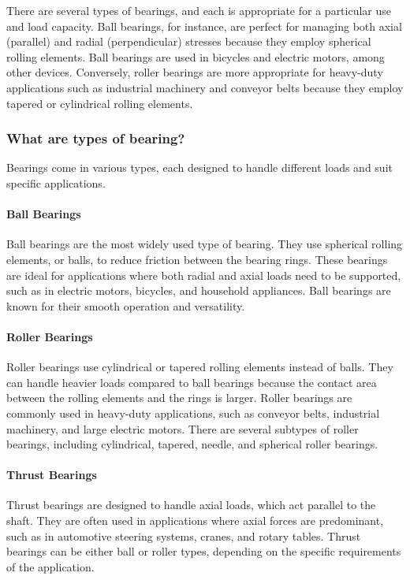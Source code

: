 \documentclass[../../main]{subfiles}
\begin{document}
There are several types of bearings, and each is appropriate for a particular use and load capacity. Ball bearings, for instance, are perfect for managing both axial (parallel) and radial (perpendicular) stresses because they employ spherical rolling elements. Ball bearings are used in bicycles and electric motors, among other devices. Conversely, roller bearings are more appropriate for heavy-duty applications such as industrial machinery and conveyor belts because they employ tapered or cylindrical rolling elements.

\subsubsection{What are types of bearing?}
Bearings come in various types, each designed to handle different loads and suit specific applications.

\paragraph{Ball Bearings}
Ball bearings are the most widely used type of bearing. They use spherical rolling elements, or balls, to reduce friction between the bearing rings. These bearings are ideal for applications where both radial and axial loads need to be supported, such as in electric motors, bicycles, and household appliances. Ball bearings are known for their smooth operation and versatility.

\paragraph{Roller Bearings}
Roller bearings use cylindrical or tapered rolling elements instead of balls. They can handle heavier loads compared to ball bearings because the contact area between the rolling elements and the rings is larger. Roller bearings are commonly used in heavy-duty applications, such as conveyor belts, industrial machinery, and large electric motors. There are several subtypes of roller bearings, including cylindrical, tapered, needle, and spherical roller bearings.

\paragraph{Thrust Bearings}
Thrust bearings are designed to handle axial loads, which act parallel to the shaft. They are often used in applications where axial forces are predominant, such as in automotive steering systems, cranes, and rotary tables. Thrust bearings can be either ball or roller types, depending on the specific requirements of the application.
\end{document}
